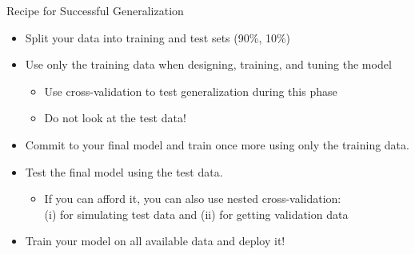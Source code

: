 \documentclass[aspectratio=169]{../latex_main/tntbeamer}  %
\begin{document}
	\begin{frame}[c]{Recipe for Successful Generalization}
	    \begin{itemize}
	        \item Split your data into training and test sets (90\%, 10\%)
	        \item Use only the training data when designing, training, and tuning the model
	        \begin{itemize}
	            \item Use cross-validation to test generalization during this phase
	            \item Do not look at the test data!
	        \end{itemize}
	        \item Commit to your final model and train once more using only the training data.
	        \item Test the final model using the test data. 
	        \begin{itemize}
	            \item If you can afford it, you can also use nested cross-validation:\\ (i) for simulating test data and (ii) for getting validation data
	        \end{itemize}
	        \item Train your model on all available data and deploy it!
	    \end{itemize}
	\end{frame}
\end{document}
